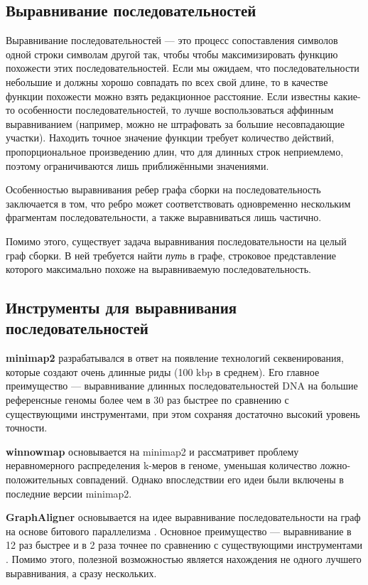 \documentclass[14pt]{matmex-diploma-custom}
\begin{document}
\subsection{Выравнивание последовательностей}
Выравнивание последовательностей --- это процесс сопоставления символов одной строки символам другой так, чтобы чтобы максимизировать функцию похожести этих последовательностей. Если мы ожидаем, что последовательности небольшие и должны хорошо совпадать по всех свой длине, то в качестве функции похожести можно взять редакционное расстояние. Если известны какие-то особенности последовательностей, то лучше воспользоваться аффинным выравниванием (например, можно не штрафовать за большие несовпадающие участки). Находить точное значение функции требует количество действий, пропорциональное произведению длин, что для длинных строк неприемлемо, поэтому ограничиваются лишь приближёнными значениями.

Особенностью выравнивания ребер графа сборки на последовательность заключается в том, что ребро может соответствовать одновременно нескольким фрагментам последовательности, а также выравниваться лишь частично.

Помимо этого, существует задача выравнивания последовательности на целый граф сборки. В ней требуется найти \textit{путь} в графе, строковое представление которого максимально похоже на выравниваемую последовательность. 

\subsection{Инструменты для выравнивания последовательностей }



\textbf{minimap2} \cite{art:minimap2} разрабатывался в ответ на появление технологий секвенирования, которые создают очень длинные риды (100 kbp в среднем). Его главное преимущество --- выравнивание длинных последовательностей DNA на большие референсные геномы более чем в 30 раз быстрее \cite{art:minimap2} по сравнению с существующими инструментами, при этом сохраняя достаточно высокий уровень точности.

\textbf{winnowmap} \cite{art:winnowmap} основывается на minimap2 и рассматривет проблему неравномерного распределения k-меров в геноме, уменьшая количество ложно-положительных совпадений. Однако впоследствии его идеи были включены в последние версии minimap2.

\textbf{GraphAligner} \cite{art:rautiainen2020graphaligner} основывается на идее выравнивание последовательности на граф на основе битового параллелизма \cite{art:bpstga}. Основное преимущество --- выравнивание в 12 раз быстрее и в 2 раза точнее по сравнению с существующими инструментами \cite{art:rautiainen2020graphaligner}. Помимо этого, полезной возможностью является нахождения не одного лучшего выравнивания, а сразу нескольких.
\end{document}
